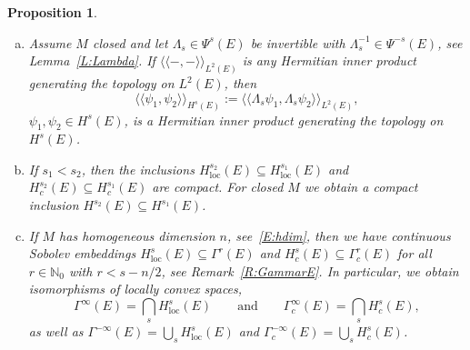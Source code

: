 \documentclass[reqno,12pt]{amsart}
\newcommand\llangle{\langle\!\langle}
\newcommand\rrangle{\rangle\!\rangle}
\newcommand\loc{\textrm{loc}}
\theoremstyle{plain}
\newtheorem{proposition}[theorem]{Proposition}
\theoremstyle{definition}
\begin{document}
\begin{proposition}
\begin{enumerate}[(a)]
\item\label{P:Hs:innerproduct}
Assume $M$ closed and let $\Lambda_s\in\Psi^s(E)$ be invertible with $\Lambda_s^{-1}\in\Psi^{-s}(E)$, see Lemma~\ref{L:Lambda}.
If $\llangle-,-\rrangle_{L^2(E)}$ is any Hermitian inner product generating the topology on $L^2(E)$, then
\begin{equation}\label{E:llrrSobolev}
\llangle\psi_1,\psi_2\rrangle_{H^s(E)}:=\llangle\Lambda_s\psi_1,\Lambda_s\psi_2\rrangle_{L^2(E)},
\end{equation}
$\psi_1,\psi_2\in H^s(E)$, is a Hermitian inner product generating the topology on $H^s(E)$.


\item\label{P:Hs:compact}
If $s_1<s_2$, then the inclusions $H^{s_2}_\loc(E)\subseteq H^{s_1}_\loc(E)$ and $H^{s_2}_c(E)\subseteq H^{s_1}_c(E)$ are compact.
For closed $M$ we obtain a compact inclusion $H^{s_2}(E)\subseteq H^{s_1}(E)$.

\item\label{P:Hs:Sobolevemb}
If $M$ has homogeneous dimension $n$, see~\eqref{E:hdim}, then we have continuous Sobolev embeddings $H^s_\loc(E)\subseteq\Gamma^r(E)$ and $H^s_c(E)\subseteq\Gamma^r_c(E)$ for all $r\in\mathbb N_0$ with $r<s-n/2$, see Remark~\ref{R:GammarE}.
In particular, we obtain isomorphisms of locally convex spaces,
$$
\Gamma^\infty(E)=\bigcap_s H^s_\loc(E)
\qquad\text{and}\qquad
\Gamma_c^\infty(E)=\bigcap_s H^s_c(E),
$$ 
as well as $\Gamma^{-\infty}(E)=\bigcup_sH^s_\loc(E)$ and\/ $\Gamma^{-\infty}_c(E)=\bigcup_sH^s_c(E)$.
\end{enumerate}
\end{proposition}
\end{document}
